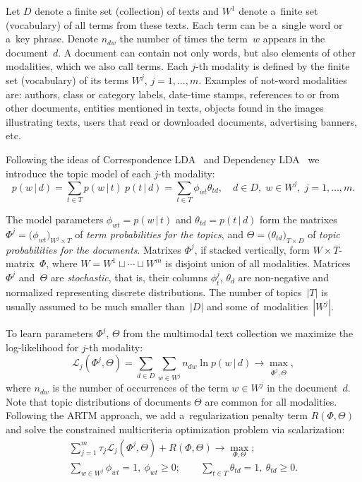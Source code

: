 \documentclass{llncs}
\newcommand{\cond}{\mspace{3mu}{|}\mspace{3mu}}
\newcommand{\cL}{\mathscr{L}}
\begin{document}

Let
$D$ denote a finite set (collection) of texts and
$W^1$ denote a~finite set (vocabulary) of all terms from these texts.
Each term can be a~single word or a~key phrase.
Denote $n_{dw}$ the number of times the term~$w$ appears in the document~$d$.
A document can contain not only words, but also elements of other modalities, which we also call terms.
Each $j$-th modality is defined by the finite set (vocabulary) of its terms $W^j$, ${j=1,\dots,m}$.
Examples of not-word modalities are:
authors,
class or category labels,
date-time stamps,
references to or from other documents,
entities mentioned in texts,
objects found in the images illustrating texts,
users that read or downloaded documents,
advertising banners,
etc.

Following the ideas of Correspondence LDA~\cite{blei03modeling}
and Dependency LDA~\cite{rubin12statistical}
we introduce the topic model of each $j$-th modality:
\[
    p(w\cond d)
    = \sum_{t\in T} p(w\cond t)\: p(t\cond d)
    = \sum_{t\in T} \phi_{wt} \theta_{td},
    \quad 
    d\in D,\; w\in W^j,\; j=1,\dots,m.
\]

The model parameters 
$\phi_{wt}=p(w\cond t)$ and $\theta_{td}=p(t\cond d)$
form the matrixes 
$\Phi^j = \bigl( \phi_{wt} \bigr)_{W^j\times T}$ of \emph{term probabilities for the topics}, and
$\Theta = \bigl( \theta_{td} \bigr)_{T\times D}$ of \emph{topic probabilities for the documents}.
Matrixes $\Phi^j$, if stacked vertically, 
form ${W\!\!\times\!T}$-matrix~$\Phi$, 
where ${W=W^1\sqcup\cdots\sqcup W^m}$ is disjoint union of all modalities.
Matrices $\Phi^j$ and~$\Theta$ are \emph{stochastic},
that is, their columns $\phi^j_t$, $\theta_d$
are non-negative and normalized representing discrete distributions.
The number of topics~$|T|$ is usually assumed to be 
much smaller than~$|D|$ and some of~modalities~$|W^j|$.

To learn parameters $\Phi^j$, $\Theta$ from the multimodal text collection
we maximize the log-likelihood for $j$-th modality:
\[
    \cL_j (\Phi^j,\Theta) =
    \sum_{d\in D}\sum_{w\in W^j} n_{dw} \ln p(w\cond d)
    \to \max_{\Phi^j,\Theta},
\]
where
$n_{dw}$ is the number of occurrences of the term $w\in W^j$ in the document~$d$.
Note that topic distributions of documents $\Theta$ are common for all modalities.
Following the ARTM approach, 
we add a~regularization penalty term $R(\Phi,\Theta)$
and solve the constrained multicriteria optimization problem via scalarization:
\begin{gather}
\label{eq:multimodal}
    \sum_{j=1}^m \tau_j \cL_j (\Phi^j,\Theta) 
    + R(\Phi,\Theta)
    \to \max_{\Phi,\Theta};
\\\label{eq:multimodal:norm}
    \sum_{w\in W^j} \phi_{wt} = 1,~
    \phi_{wt}\geq 0;
    \qquad
    \sum_{t\in T} \theta_{td} = 1,~
    \theta_{td}\geq 0.
\end{gather}
\end{document}
